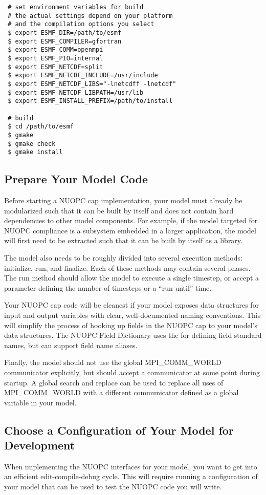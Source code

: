 \begin{verbatim}
 # set environment variables for build
 # the actual settings depend on your platform
 # and the compilation options you select
 $ export ESMF_DIR=/path/to/esmf
 $ export ESMF_COMPILER=gfortran
 $ export ESMF_COMM=openmpi
 $ export ESMF_PIO=internal
 $ export ESMF_NETCDF=split
 $ export ESMF_NETCDF_INCLUDE=/usr/include
 $ export ESMF_NETCDF_LIBS="-lnetcdff -lnetcdf"
 $ export ESMF_NETCDF_LIBPATH=/usr/lib
 $ export ESMF_INSTALL_PREFIX=/path/to/install

 # build
 $ cd /path/to/esmf
 $ gmake
 $ gmake check
 $ gmake install
\end{verbatim}


\subsection{Prepare Your Model Code}
\label{sec:preparemodel}
Before starting a NUOPC cap implementation, your model must already
be modularized such that it can be built by itself and does not
contain hard dependencies to other model components.  For example,
if the model targeted for NUOPC compliance is a subsystem embedded
in a larger application, the model will first need to be extracted
such that it can be built by itself as a library.

The model also needs to be roughly divided into several execution
methods: initialize, run, and finalize.  Each of these methods may
contain several phases.  The run method should allow the model to
execute a single timestep, or accept a parameter defining the number of
timesteps or a ``run until'' time.

Your NUOPC cap code will be cleanest if your model exposes data
structures for input and output variables with clear, well-documented
naming conventions. This will simplify the process of hooking up fields
in the NUOPC cap to your model's data structures.  The NUOPC Field
Dictionary uses the 
for defining field standard names, but can support field name aliases.

Finally, the model should not use the global MPI\_COMM\_WORLD communicator
explicitly, but should accept a communicator at some point during
startup.  A global search and replace can be used to replace
all uses of MPI\_COMM\_WORLD with a different communicator defined
as a global variable in your model.


\subsection{Choose a Configuration of Your Model for Development}
\label{sec:chooseconfig}
When implementing the NUOPC interfaces for your model, you want to
get into an efficient edit-compile-debug cycle.  This will require
running a configuration of your model that can be used to test the
NUOPC code you will write.

